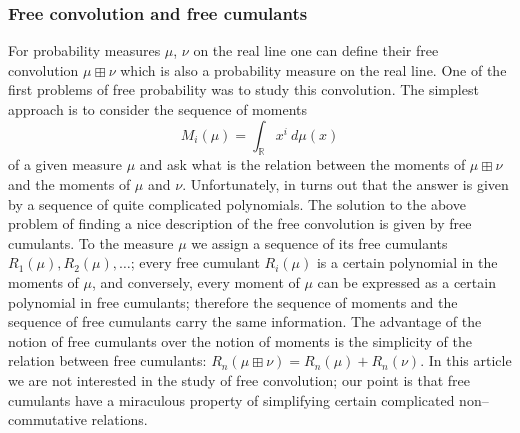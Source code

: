 \documentclass[12pt,dvips]{amsart}
\numberwithin{equation}{section} \numberwithin{figure}{section}
\theoremstyle{plain}
\theoremstyle{definition}
\theoremstyle{remark}
\newcommand{\R}{{\mathbb{R}}}
\begin{document}
\subsubsection{Free convolution and free cumulants}
\label{subsec:convolution} For probability measures $\mu$, $\nu$ on
the real line one can define their free convolution $\mu\boxplus\nu$
which is also a probability measure on the real line. One of the
first problems of free probability was to study this convolution.
The simplest approach is to consider the sequence of moments
\begin{equation}
M_i(\mu)=\int_{\R} x^i \ d\mu(x) \label{eq:momenty}
\end{equation}
of a given measure $\mu$ and ask what is the relation between the
moments of $\mu\boxplus\nu$ and the moments of $\mu$ and $\nu$.
Unfortunately, in turns out that the answer is given by a sequence
of quite complicated polynomials.
The solution to the above problem of finding a nice description of
the free convolution is given by free cumulants. To the measure
$\mu$ we assign a sequence of its free cumulants
$R_1(\mu),R_2(\mu),\dots$;
every free cumulant $R_i(\mu)$ is a certain polynomial in the
moments of $\mu$, and conversely, every moment of $\mu$ can be
expressed as a certain polynomial in free cumulants; therefore the
sequence of moments and the sequence of free cumulants carry the
same information. The advantage of the notion of free cumulants over
the notion of moments is the simplicity of the relation between free
cumulants: $R_n(\mu\boxplus\nu)=R_n(\mu)+R_n(\nu)$. In this article
we are not interested in the study of free convolution; our point is
that free cumulants have a miraculous property of simplifying
certain complicated non--commutative relations.
\end{document}
